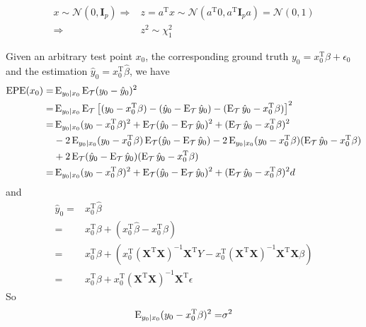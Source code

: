 \begin{sol}
\begin{align*}
x\sim\mathcal{N}(0,\mathbf{I}_p)\Longrightarrow & z=a^\mathrm{T}x\sim\mathcal{N}(a^\mathrm{T}0,a^\mathrm{T}\mathbf{I}_pa)=\mathcal{N}(0,1)\\
\Longrightarrow & z^2\sim \chi_1^2
\end{align*}
\end{sol}

\begin{sol}
Given an arbitrary test point $x_0$, the corresponding ground truth $y_0=x_0^\mathrm{T}\beta+\epsilon_0$ and the estimation $\hat{y}_0=x_0^\mathrm{T}\hat{\beta}$, we have
\begin{align*}
\mathrm{EPE}(x_0) = & \operatorname{E}_{y_0\vert x_0}\operatorname{E}_{\mathcal{T}}(y_0-\hat{y}_0)^2\\
=& \operatorname{E}_{y_0\vert x_0}\operatorname{E}_{\mathcal{T}}\left[(y_0-x_0^\mathrm{T}\beta)-(\hat{y}_0-\operatorname{E}_\mathcal{T}\hat{y}_0)-(\operatorname{E}_\mathcal{T}\hat{y}_0-x_0^\mathrm{T}\beta)\right]^2 \\
=& \operatorname{E}_{y_0\vert x_0}(y_0-x_0^\mathrm{T}\beta)^2+\operatorname{E}_{\mathcal{T}}(\hat{y}_0-\operatorname{E}_\mathcal{T}\hat{y}_0)^2+(\operatorname{E}_\mathcal{T}\hat{y}_0-x_0^\mathrm{T}\beta)^2 \\
& -2 \operatorname{E}_{y_0\vert x_0}(y_0-x_0^\mathrm{T}\beta) \operatorname{E}_{\mathcal{T}}(\hat{y}_0-\operatorname{E}_\mathcal{T}\hat{y}_0) -2 \operatorname{E}_{y_0\vert x_0}(y_0-x_0^\mathrm{T}\beta) (\operatorname{E}_\mathcal{T}\hat{y}_0-x_0^\mathrm{T}\beta) \\
& +2 \operatorname{E}_{\mathcal{T}}(\hat{y}_0-\operatorname{E}_\mathcal{T}\hat{y}_0)(\operatorname{E}_\mathcal{T}\hat{y}_0-x_0^\mathrm{T}\beta) \\
=& \operatorname{E}_{y_0\vert x_0}(y_0-x_0^\mathrm{T}\beta)^2+\operatorname{E}_{\mathcal{T}}(\hat{y}_0-\operatorname{E}_\mathcal{T}\hat{y}_0)^2+(\operatorname{E}_\mathcal{T}\hat{y}_0-x_0^\mathrm{T}\beta)^2d
\end{align*}
and
\begin{align*}
\hat{y}_0 =& x_0^\mathrm{T}\hat{\beta}\\
=& x_0^\mathrm{T}\beta + (x_0^\mathrm{T}\hat{\beta}-x_0^\mathrm{T}\beta)\\
=& x_0^\mathrm{T}\beta + \left(x_0^\mathrm{T}(\mathbf{X}^\mathrm{T}\mathbf{X})^{-1}\mathbf{X}^\mathrm{T}Y-x_0^\mathrm{T}(\mathbf{X}^\mathrm{T}\mathbf{X})^{-1}\mathbf{X}^\mathrm{T}\mathbf{X}\beta\right) \\
=& x_0^\mathrm{T}\beta + x_0^\mathrm{T}(\mathbf{X}^\mathrm{T}\mathbf{X})^{-1}\mathbf{X}^\mathrm{T}\epsilon
\end{align*}
So
\begin{align*}
\E_{y_0\vert x_0}(y_0-x_0^\mathrm{T}\beta)^2 =& \sigma^2 \\

\end{align*}
\end{sol}
